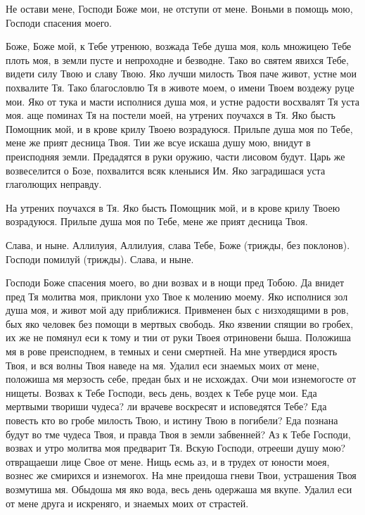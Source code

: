 Не остави мене, Господи Боже мои, не отступи от мене. Воньми в помощь мою, Господи спасения моего.




Боже, Боже мой, к Тебе утренюю, возжада Тебе душа моя, коль множицею Тебе плоть моя, в земли пусте и непроходне и безводне. Тако во святем явихся Тебе, видети силу Твою и славу Твою. Яко лучши милость Твоя паче живот, устне мои похвалите Тя. Тако благословлю Тя в животе моем, о имени Твоем воздежу руце мои. Яко от тука и масти исполнися душа моя, и устне радости восхвалят Тя уста моя. аще поминах Тя на постели моей, на утрених поучахся в Тя. Яко бысть Помощник мой, и в крове крилу Твоею возрадуюся. Прильпе душа моя по Тебе, мене же прият десница Твоя. Тии же всуе искаша душу мою, внидут в преисподняя земли. Предадятся в руки оружию, части лисовом будут. Царь же возвеселится о Бозе, похвалится всяк кленыися Им. Яко заградишася уста глаголющих неправду.

На утрених поучахся в Тя. Яко бысть Помощник мой, и в крове крилу Твоею возрадуюся. Прильпе душа моя по Тебе, мене же прият десница Твоя. 

Слава, и ныне. Аллилуия, Аллилуия, слава Тебе, Боже (трижды, без поклонов). Господи помилуй (трижды). Слава, и ныне.




Господи Боже спасения моего, во дни возвах и в нощи пред Тобою. Да внидет пред Тя молитва моя, приклони ухо Твое к молению моему. Яко исполнися зол душа моя, и живот мой аду приближися. Привменен бых с низходящими в ров, бых яко человек без помощи в мертвых свободь. Яко язвении спящии во гробех, их же не помянул еси к тому и тии от руки Твоея отриновени быша. Положиша мя в рове преисподнем, в темных и сени смертней. На мне утвердися ярость Твоя, и вся волны Твоя наведе на мя. Удалил еси знаемых моих от мене, положиша мя мерзость себе, предан бых и не исхождах. Очи мои изнемогосте от нищеты. Возвах к Тебе Господи, весь день, воздех к Тебе руце мои. Еда мертвыми твориши чудеса? ли врачеве воскресят и исповедятся Тебе? Еда повесть кто во гробе милость Твою, и истину Твою в погибели? Еда познана будут во тме чудеса Твоя, и правда Твоя в земли забвенней? Аз к Тебе Господи, возвах и утро молитва моя предварит Тя. Вскую Господи, отрееши душу мою? отвращаеши лице Свое от мене. Нищь есмь аз, и в трудех от юности моея, вознес же смирихся и изнемогох. На мне преидоша гневи Твои, устрашения Твоя возмутиша мя. Обыдоша мя яко вода, весь день одержаша мя вкупе. Удалил еси от мене друга и искреняго, и знаемых моих от страстей.

